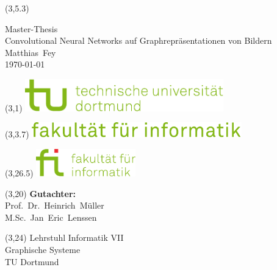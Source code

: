 \begin{titlepage}


\setlength{\TPHorizModule}{1cm}
\setlength{\TPVertModule}{1cm}
\setlength{\parindent}{0cm}

\sffamily

\vspace*{2cm}

\begin{textblock}{9}(3,5.3)
  \Large
  \begin{minipage}[c][9cm]{9cm}
    \begin{center}
      {\Huge Master-Thesis}\\
      \vspace*{1cm}
      {\huge Convolutional Neural Networks auf Graphrepräsentationen von Bildern}\\
      \vspace*{1cm}
      Matthias~Fey\\
      \today
    \end{center}
  \end{minipage}
  \normalsize
\end{textblock}

\begin{textblock}{9}(3,1)
  \includegraphics[height=1.4cm]{images/tud_logo}
\end{textblock}

\begin{textblock}{15}(3,3.7)
  \includegraphics[height=0.65cm]{images/fi_text}
\end{textblock}

\begin{textblock}{9}(3,26.5)
  \includegraphics[height=1.2cm]{images/fi_logo}
\end{textblock}

\begin{textblock}{9}(3,20)
  \Large
  \textbf{Gutachter:}\\
  Prof.~Dr.~Heinrich~Müller\\
  M.Sc.~Jan~Eric~Lenssen
  \normalsize
\end{textblock}

\begin{textblock}{9}(3,24)
  \large
  \textcolor{TUGreen}{
    Lehrstuhl Informatik VII\\
    Graphische Systeme\\
    TU Dortmund
  }
  \normalsize
\end{textblock}

\end{titlepage}
